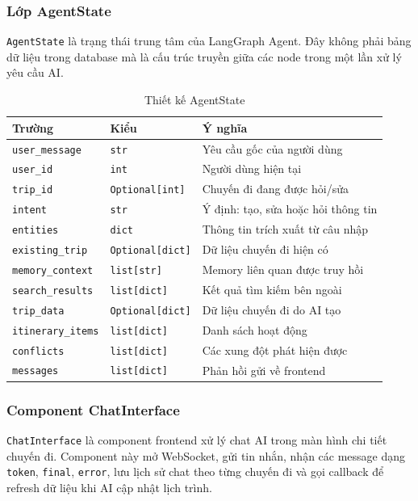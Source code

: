 \documentclass[../DoAn.tex]{subfiles}
\begin{document}
\subsubsection{Lớp AgentState}

\texttt{AgentState} là trạng thái trung tâm của LangGraph Agent. Đây không phải bảng dữ liệu trong database mà là cấu trúc truyền giữa các node trong một lần xử lý yêu cầu AI.

\begin{table}[H]
\centering
\begin{tabular}{lll}
\hline
\textbf{Trường} & \textbf{Kiểu} & \textbf{Ý nghĩa} \\ \hline
\texttt{user\_message} & \texttt{str} & Yêu cầu gốc của người dùng \\ \hline
\texttt{user\_id} & \texttt{int} & Người dùng hiện tại \\ \hline
\texttt{trip\_id} & \texttt{Optional[int]} & Chuyến đi đang được hỏi/sửa \\ \hline
\texttt{intent} & \texttt{str} & Ý định: tạo, sửa hoặc hỏi thông tin \\ \hline
\texttt{entities} & \texttt{dict} & Thông tin trích xuất từ câu nhập \\ \hline
\texttt{existing\_trip} & \texttt{Optional[dict]} & Dữ liệu chuyến đi hiện có \\ \hline
\texttt{memory\_context} & \texttt{list[str]} & Memory liên quan được truy hồi \\ \hline
\texttt{search\_results} & \texttt{list[dict]} & Kết quả tìm kiếm bên ngoài \\ \hline
\texttt{trip\_data} & \texttt{Optional[dict]} & Dữ liệu chuyến đi do AI tạo \\ \hline
\texttt{itinerary\_items} & \texttt{list[dict]} & Danh sách hoạt động \\ \hline
\texttt{conflicts} & \texttt{list[dict]} & Các xung đột phát hiện được \\ \hline
\texttt{messages} & \texttt{list[dict]} & Phản hồi gửi về frontend \\ \hline
\end{tabular}
\caption{Thiết kế AgentState}
\label{tab:agent-state-design}
\end{table}

\subsubsection{Component ChatInterface}

\texttt{ChatInterface} là component frontend xử lý chat AI trong màn hình chi tiết chuyến đi. Component này mở WebSocket, gửi tin nhắn, nhận các message dạng \texttt{token}, \texttt{final}, \texttt{error}, lưu lịch sử chat theo từng chuyến đi và gọi callback để refresh dữ liệu khi AI cập nhật lịch trình.
\end{document}
